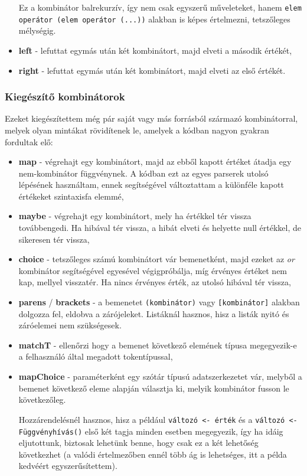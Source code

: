 \begin{itemize}
    Ez a kombinátor balrekurzív, így nem csak egyszerű műveleteket, hanem \texttt{elem operátor (elem operátor (...))} alakban is képes értelmezni, tetszőleges mélységig.
    \item \textbf{left} - lefuttat egymás után két kombinátort, majd elveti a második értékét,
    \item \textbf{right} - lefuttat egymás után két kombinátort, majd elveti az első értékét.
\end{itemize}

\subsubsection{Kiegészítő kombinátorok}

Ezeket kiegészítettem még pár saját vagy más forrásból származó kombinátorral, melyek olyan mintákat rövidítenek le, amelyek a kódban nagyon gyakran fordultak elő:

\begin{itemize}
    \item \textbf{map} - végrehajt egy kombinátort, majd az ebből kapott értéket átadja egy nem-kombinátor függvénynek. A kódban ezt az egyes parserek utolsó lépésének használtam, ennek segítségével változtattam a különféle kapott értékeket szintaxisfa elemmé,
    \item \textbf{maybe} - végrehajt egy kombinátort, mely ha értékkel tér vissza továbbengedi. Ha hibával tér vissza, a hibát elveti és helyette null értékkel, de sikeresen tér vissza,
    \item \textbf{choice} - tetszőleges számú kombinátort vár bemenetként, majd ezeket az \textit{or} kombinátor segítségével egyesével végigpróbálja, míg érvényes értéket nem kap, mellyel visszatér. Ha nincs érvényes érték, az utolsó hibával tér vissza,
    \item \textbf{parens} / \textbf{brackets} - a bemenetet \verb_(kombinátor)_ vagy \verb_[kombinátor]_ alakban dolgozza fel, eldobva a zárójeleket. Listáknál hasznos, hisz a listák nyitó és záróelemei nem szükségesek.
    \item \textbf{matchT} - ellenőrzi hogy a bemenet következő elemének típusa megegyezik-e a felhasználó által megadott tokentípussal,
    \item \textbf{mapChoice} - paraméterként egy szótár típusú adatszerkezetet vár, melyből a bemenet következő eleme alapján választja ki, melyik kombinátor fusson le következőleg.
    
    Hozzárendelésnél hasznos, hisz a például \texttt{változó <- érték} és a \texttt{változó <- Függvényhívás()} első két tagja minden esetben megegyezik, így ha idáig eljutottunk, biztosak lehetünk benne, hogy csak ez a két lehetőség következhet (a valódi értelmezőben ennél több ág is lehetséges, itt a példa kedvéért egyszerűsítettem).
\end{itemize}

